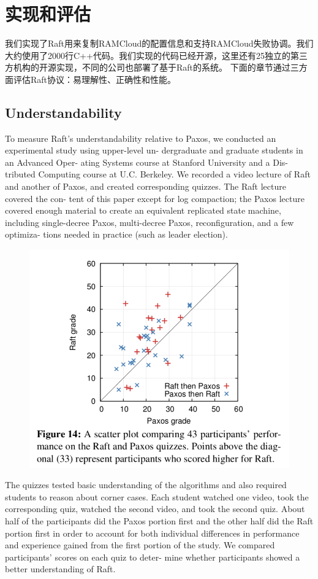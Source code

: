 \documentclass[journal]{IEEEtran}
\begin{document}
\section{实现和评估}
我们实现了Raft用来复制RAMCloud的配置信息和支持RAMCloud失败协调。我们大约使用了2000行C++代码。我们实现的代码已经开源，这里还有25独立的第三方机构的开源实现，不同的公司也部署了基于Raft的系统。
下面的章节通过三方面评估Raft协议：易理解性、正确性和性能。

\subsection{Understandability}
To measure Raft’s understandability relative to Paxos, we conducted an experimental study using upper-level un- dergraduate and graduate students in an Advanced Oper- ating Systems course at Stanford University and a Dis- tributed Computing course at U.C. Berkeley. We recorded a video lecture of Raft and another of Paxos, and created corresponding quizzes. The Raft lecture covered the con- tent of this paper except for log compaction; the Paxos lecture covered 
enough material to create an equivalent replicated state machine, 
including single-decree Paxos, multi-decree Paxos, reconfiguration, and a few optimiza- tions needed in practice (such as leader election). 
\begin{figure}[htbp]
\begin{center}
\includegraphics[width=1\linewidth]{./fig14.png}
\end{center}
\end{figure}
The quizzes tested basic understanding of the algorithms and also required students to reason about corner cases. Each student watched one video, took the corresponding quiz, watched the second video, and took the second quiz. About half of the participants did the Paxos portion first and the other half did the Raft portion first in order to account for both individual differences in performance and experience gained from the first portion of the study. We compared participants’ scores on each quiz to deter- mine whether participants showed a better understanding of Raft.
\end{document}
